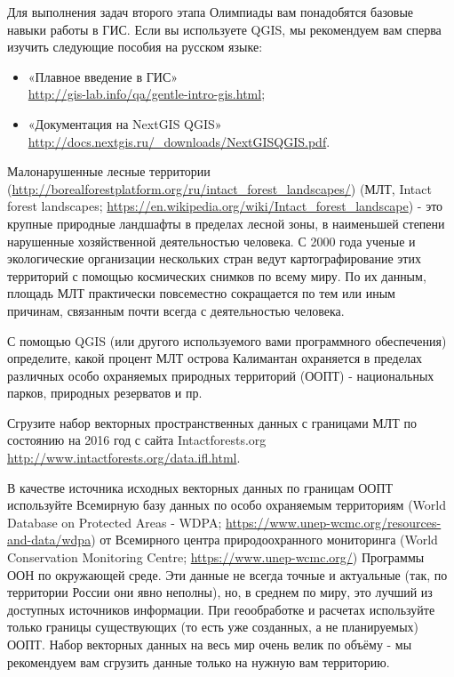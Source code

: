 
Для выполнения задач второго этапа Олимпиады вам понадобятся базовые навыки работы в ГИС. Если вы используете QGIS, мы рекомендуем вам сперва изучить следующие пособия на русском языке:

\begin{itemize}
    \item «Плавное введение в ГИС»\\ \url{http://gis-lab.info/qa/gentle-intro-gis.html};
    \item «Документация на NextGIS QGIS» \\ \url{http://docs.nextgis.ru/_downloads/NextGISQGIS.pdf}.
\end{itemize}

Малонарушенные лесные территории (\url{http://borealforestplatform.org/ru/intact_forest_landscapes/}) (МЛТ, Intact forest landscapes; \url{https://en.wikipedia.org/wiki/Intact_forest_landscape}) - это крупные природные ландшафты в пределах лесной зоны, в наименьшей степени нарушенные хозяйственной деятельностью человека. С 2000 года ученые и экологические организации нескольких стран ведут картографирование этих территорий с помощью космических снимков по всему миру. По их данным, площадь МЛТ практически повсеместно сокращается по тем или иным причинам, связанным почти всегда с деятельностью человека. 

С помощью QGIS (или другого используемого вами программного обеспечения) определите, какой процент МЛТ острова Калимантан охраняется в пределах различных особо охраняемых природных территорий (ООПТ) - национальных парков, природных резерватов и пр.

Сгрузите набор векторных пространственных данных с границами МЛТ по состоянию на 2016 год с сайта 
Intactforests.org \url{http://www.intactforests.org/data.ifl.html}.

В качестве источника исходных векторных данных по границам ООПТ используйте Всемирную базу 
данных по особо охраняемым территориям (World Database on Protected Areas - WDPA; \url{https://www.unep-wcmc.org/resources-and-data/wdpa}) 
от Всемирного центра природоохранного мониторинга (World Conservation Monitoring Centre; \url{https://www.unep-wcmc.org/}) Программы ООН по окружающей среде. Эти данные не всегда точные и актуальные (так, по территории России они явно неполны), но, в среднем по миру, это лучший из доступных источников информации. При геообработке и расчетах используйте только границы существующих (то есть уже созданных, а не планируемых) ООПТ. Набор векторных данных на весь мир очень велик по объёму - мы рекомендуем вам сгрузить данные только на нужную вам территорию.

